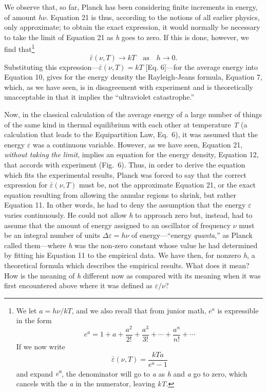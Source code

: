 We observe that, so far, Planck has been considering finite increments
in energy, of amount $h\nu$. Equation 21 is thus, according to the
notions of all earlier physics, only approximate; to obtain the exact
expression, it would normally be necessary to take the limit of Equation
21 as \emph{h} goes to zero. If this is done, however, we find
that\footnote{We let $a = h\nu/kT$, and we also recall that from
  junior math, $e^a$ is expressible in the form
\begin{equation*}
e^a = 1 + a + \frac{a^2}{2!} + \frac{a^3}{3!} + \cdots + \frac{a^n}{n!} + \cdots
\end{equation*}
  If we now write
\begin{equation*}
\bar{\varepsilon}(\nu, T) = \frac{kTa}{e^a - 1}
\end{equation*}
  and expand \emph{e\textsuperscript{a}}, the denominator will go to
  \emph{a} as \emph{h} and \emph{a} go to zero, which cancels with the
  \emph{a} in the numerator, leaving \emph{kT}.}
%
\begin{equation*}
\bar{\varepsilon}(\nu, T) \rightarrow kT\quad \text{as}\quad h \rightarrow 0.
\end{equation*}
%
Substituting this expression---$\bar{\varepsilon}(\nu, T) = kT$ {[}Eq.
6{]}---for the average energy into Equation 10, gives for the energy
density the Rayleigh-Jeans formula, Equation 7, which, as we have seen,
is in disagreement with experiment and is theoretically unacceptable in
that it implies the ``ultraviolet catastrophe.''

Now, in the classical calculation of the average energy of a large
number of things of the same kind in thermal equilibrium with each other
at temperature \emph{T} (a calculation that leads to the Equipartition
Law, Eq.\ 6), it was assumed that the energy $\varepsilon$ was a continuous
variable. However, as we have seen, Equation 21, \emph{without taking
the limit}, implies an equation for the energy density, Equation 12,
that accords with experiment (Fig.\ 6). Thus, in order to derive the
equation which fits the experimental results, Planck was forced to say
that the correct expression for $\bar{\varepsilon}(\nu, T)$ must be, not the
approximate Equation 21, or the exact equation resulting from allowing
the annular regions to shrink, but rather Equation 11. In other words,
he had to deny the assumption that the energy $\varepsilon$ varies
continuously. He could not allow \emph{h} to approach zero but, instead,
had to assume that the amount of energy assigned to an oscillator of
frequency $\nu$ must be an integral number of units $\Delta\varepsilon = h\nu$ of
energy---``energy \emph{quanta},'' as Planck called them---where
\emph{h} was the non-zero constant whose value he had determined by
fitting his Equation 11 to the empirical data. We have then, for nonzero
\emph{h}, a theoretical formula which describes the empirical results.
What does it mean? How is the meaning of \emph{h} different now as
compared with its meaning when it was first encountered above where it
was defined as $\varepsilon/\nu$?

